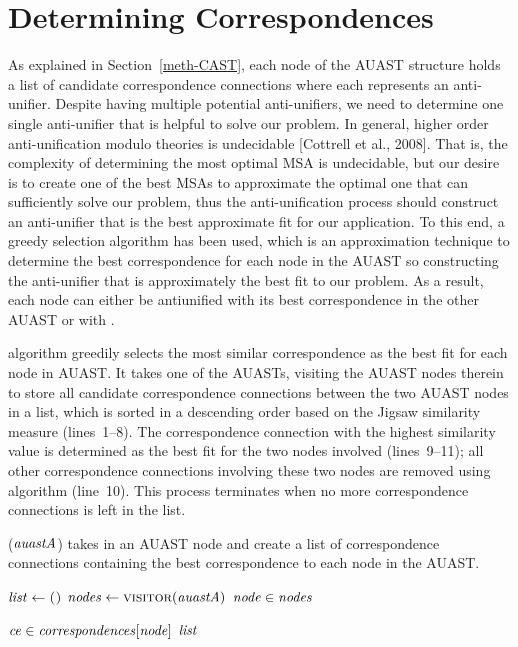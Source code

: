 \section{Determining Correspondences} \label{meth-correspondence}
As explained in Section~\ref{meth-CAST}, each node of the AUAST structure holds a list of candidate correspondence connections where each represents an anti-unifier. Despite having multiple potential anti-unifiers, we need to determine one single anti-unifier that is helpful to solve our problem. In general, higher order anti-unification modulo theories is undecidable [Cottrell et al., 2008]. That is, the complexity of determining the most optimal MSA is undecidable, but our desire is to create one of the best MSAs to approximate the optimal one that can sufficiently solve our problem, thus the anti-unification process should construct an anti-unifier that is the best approximate fit for our application. To this end, a greedy selection algorithm has been used, which is an approximation technique to determine the best correspondence for each node in the AUAST so constructing the anti-unifier that is approximately the best fit to our problem. As a result, each node can either be antiunified with its best correspondence in the other AUAST or with \nothing.

 algorithm greedily selects the most similar correspondence as the best fit for each node in AUAST. It takes one of the AUASTs, visiting the AUAST nodes therein to store all candidate correspondence connections between the two AUAST nodes in a list, which is sorted in a descending order based on the Jigsaw similarity measure (lines~1--8). The correspondence connection with the highest similarity value is determined as the best fit for the two nodes involved (lines~9--11); all other correspondence connections involving these two nodes are removed using  algorithm (line~10). This process terminates when no more correspondence connections is left in the list.
\begin{algorithm}
\caption{($\mathit{auastA}$) takes in an AUAST node and create a list of correspondence connections containing the best correspondence to each node in the AUAST.}
\label{alg-determine}
\begin{algorithmic}[1]
\CreateList
    \State $\mathit{list} \gets \textsc{()}$
    \State $\mathit{nodes} \gets \textsc{visitor}(\mathit{auastA})$
	  \For $\mathit{node} \in \mathit{nodes}$
	
				\For $\mathit{ce} \in  \mathit{correspondences}[\mathit{node}]$		
			 	\EndFor  	
	   \EndFor		
	   \EndFor
 \Return $\mathit{list} $  	
  \end{algorithmic}
\end{algorithm}

